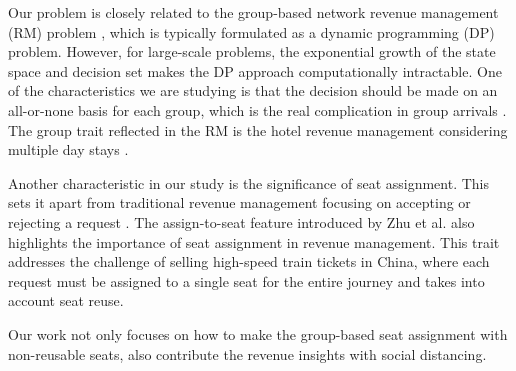 
Our problem is closely related to the group-based network revenue management (RM) problem \cite{williamson1992airline}, which is typically formulated as a dynamic programming (DP) problem. However, for large-scale problems, the exponential growth of the state space and decision set makes the DP approach computationally intractable. One of the characteristics we are studying is that the decision should be made on an all-or-none basis for each group, which is the real complication in group arrivals \cite{talluri2006theory}. The group trait reflected in the RM is the hotel revenue management considering multiple day stays \cite{aydin2018decomposition, bitran1995application}. 

Another characteristic in our study is the significance of seat assignment. This sets it apart from traditional revenue management focusing on accepting or rejecting a request \cite{gallego1997multiproduct}. The assign-to-seat feature introduced by Zhu et al. \cite{zhu2023assign} also highlights the importance of seat assignment in revenue management. This trait addresses the challenge of selling high-speed train tickets in China, where each request must be assigned to a single seat for the entire journey and takes into account seat reuse.


Our work not only focuses on how to make the group-based seat assignment with non-reusable seats, also contribute the revenue insights with social distancing.









